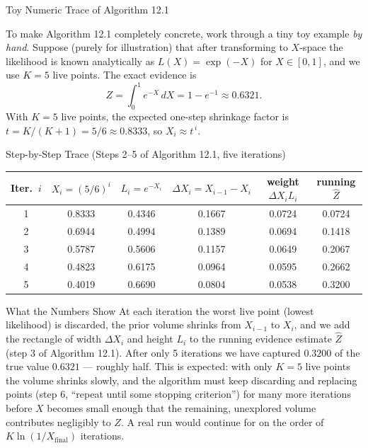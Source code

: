 \documentclass[aspectratio=169,10pt]{beamer}
\begin{document}
\begin{frame}[allowframebreaks]{Toy Numeric Trace of Algorithm 12.1}

To make Algorithm 12.1 completely concrete, work through a tiny toy example \emph{by hand}. Suppose (purely for illustration) that after transforming to $X$-space the likelihood is known analytically as $L(X)=\exp(-X)$ for $X\in[0,1]$, and we use $K=5$ live points. The exact evidence is
\[
  Z = \int_0^1 e^{-X}\,dX = 1-e^{-1} \approx 0.6321.
\]
With $K=5$ live points, the expected one-step shrinkage factor is $t = K/(K+1) = 5/6 \approx 0.8333$, so $X_i \approx t^{\,i}$.

\begin{block}{Step-by-Step Trace (Steps 2--5 of Algorithm 12.1, five iterations)}
\begin{center}
{\footnotesize
\begin{tabular}{cccccc}
\toprule
Iter.\ $i$ & $X_i=(5/6)^i$ & $L_i=e^{-X_i}$ & $\Delta X_i=X_{i-1}\!-\!X_i$ & weight $\Delta X_i L_i$ & running $\hat Z$ \\
\midrule
1 & 0.8333 & 0.4346 & 0.1667 & 0.0724 & 0.0724 \\
2 & 0.6944 & 0.4994 & 0.1389 & 0.0694 & 0.1418 \\
3 & 0.5787 & 0.5606 & 0.1157 & 0.0649 & 0.2067 \\
4 & 0.4823 & 0.6175 & 0.0964 & 0.0595 & 0.2662 \\
5 & 0.4019 & 0.6690 & 0.0804 & 0.0538 & 0.3200 \\
\bottomrule
\end{tabular}
}
\end{center}
\end{block}

\begin{alertblock}{What the Numbers Show}
At each iteration the worst live point (lowest likelihood) is discarded, the prior volume shrinks from $X_{i-1}$ to $X_i$, and we add the rectangle of width $\Delta X_i$ and height $L_i$ to the running evidence estimate $\hat Z$ (step 3 of Algorithm 12.1). After only 5 iterations we have captured $0.3200$ of the true value $0.6321$ --- roughly half. This is expected: with only $K=5$ live points the volume shrinks slowly, and the algorithm must keep discarding and replacing points (step 6, ``repeat until some stopping criterion'') for many more iterations before $X$ becomes small enough that the remaining, unexplored volume contributes negligibly to $Z$. A real run would continue for on the order of $K\ln(1/X_{\text{final}})$ iterations.
\end{alertblock}

\end{frame}
\end{document}
